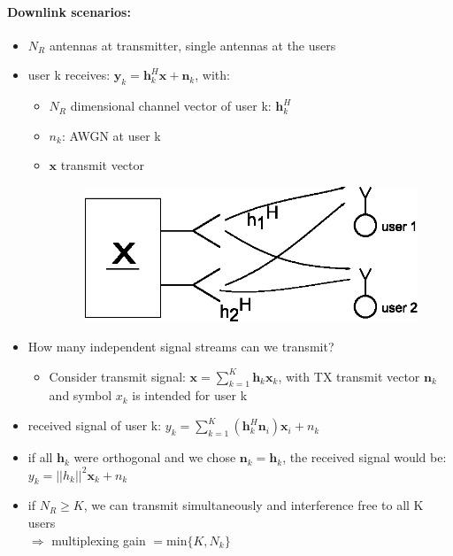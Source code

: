 \documentclass[a4paper, 10pt]{article}
\begin{document}
\paragraph{Downlink scenarios:}
\begin{itemize}
	\item $N_R $ antennas at transmitter, single antennas at the users
	\item user k receives: $ \mathbf{y}_k = \mathbf{h}_k^H\mathbf{x} + \mathbf{n}_k $, with:
	\begin{itemize}
		\item $N_R $ dimensional channel vector of user k: $\mathbf{h}_k^H $
		\item $n_k$: AWGN at user k
		\item $\mathbf{x} $ transmit vector  
	\begin{figure}[ht]\centering
		\includegraphics[scale=0.8]{BroadcastChannel_scenario}
	\end{figure}
	\end{itemize}
	\item How many independent signal streams can we transmit?
	\begin{itemize}
		\item Consider transmit signal: $\mathbf{x} = \sum\limits_{k = 1}^{K}\mathbf{h}_k\mathbf{x}_k $, with TX transmit vector $\mathbf{n}_k $ and symbol $x_k $ is intended for user k
	\end{itemize}
	\item received signal of user k: $y_k = \sum\limits_{k = 1}^{K}(\mathbf{h}_k^H\mathbf{n}_i)\mathbf{x}_i + n_k $
	\item if all $\mathbf{h}_k $ were orthogonal and we chose $\mathbf{n}_k = \mathbf{h}_k $, the received signal would be: \\ $y_k = ||h_k||^2\mathbf{x}_k + n_k $
	\item if $N_R \geq K$, we can transmit simultaneously and interference free to all K users\\ $\Rightarrow $ multiplexing gain $= \text{min}\{K,N_k\} $
\end{itemize}
\end{document}
